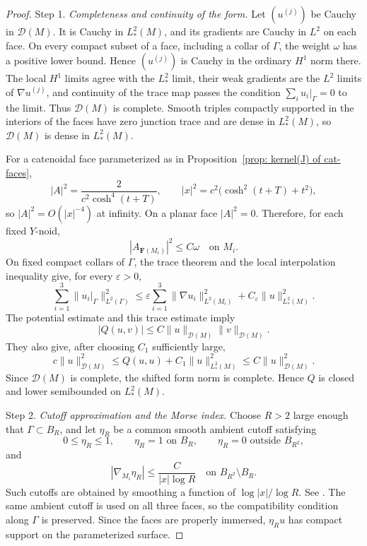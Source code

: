 \documentclass[11pt,twoside]{amsart}
\numberwithin{equation}{section}
\begin{document}
\begin{proof}
\noindent Step 1. \emph{Completeness and continuity of the form.}
Let $(u^{(j)})$ be Cauchy in $\mathcal D(M)$. It is Cauchy in $L_*^2(M)$, and its gradients are Cauchy in $L^2$ on each face. On every compact subset of a face, including a collar of $\Gamma$, the weight $\omega$ has a positive lower bound. Hence $(u^{(j)})$ is Cauchy in the ordinary $H^1$ norm there. The local $H^1$ limits agree with the $L_*^2$ limit, their weak gradients are the $L^2$ limits of $\nabla u^{(j)}$, and continuity of the trace map passes the condition $\sum_i u_i|_\Gamma=0$ to the limit. Thus $\mathcal D(M)$ is complete. Smooth triples compactly supported in the interiors of the faces have zero junction trace and are dense in $L_*^2(M)$, so $\mathcal D(M)$ is dense in $L_*^2(M)$.

For a catenoidal face parameterized as in Proposition~\ref{prop: kernel(J) of cat-faces},
\[
|A|^2=\frac{2}{c^2\cosh^4(t+T)},
\qquad
|x|^2=c^2\bigl(\cosh^2(t+T)+t^2\bigr),
\]
so $|A|^2=O(|x|^{-4})$ at infinity. On a planar face $|A|^2=0$. Therefore, for each fixed $Y$-noid,
\[
|A_{\mathbf F(M_i)}|^2\le C\omega\quad\text{on }M_i.
\]
On fixed compact collars of $\Gamma$, the trace theorem and the local interpolation inequality give, for every $\varepsilon>0$,
\[
\sum_{i=1}^3\|u_i|_\Gamma\|_{L^2(\Gamma)}^2
\le
\varepsilon\sum_{i=1}^3\|\nabla u_i\|_{L^2(M_i)}^2
+C_\varepsilon\|u\|_{L_*^2(M)}^2.
\]
The potential estimate and this trace estimate imply
\[
|Q(u,v)|\le C\|u\|_{\mathcal D(M)}\|v\|_{\mathcal D(M)}.
\]
They also give, after choosing $C_1$ sufficiently large,
\[
c\|u\|_{\mathcal D(M)}^2
\le Q(u,u)+C_1\|u\|_{L_*^2(M)}^2
\le C\|u\|_{\mathcal D(M)}^2.
\]
Since $\mathcal D(M)$ is complete, the shifted form norm is complete. Hence $Q$ is closed and lower semibounded on $L_*^2(M)$.

\medskip
\noindent Step 2. \emph{Cutoff approximation and the Morse index.}
Choose $R>2$ large enough that $\Gamma\subset B_R$, and let $\eta_R$ be a common smooth ambient cutoff satisfying
\[
0\le\eta_R\le1,
\qquad
\eta_R=1\text{ on }B_R,
\qquad
\eta_R=0\text{ outside }B_{R^2},
\]
and
\[
|\nabla_{M_i}\eta_R|
\le\frac{C}{|x|\log R}
\quad\text{on }B_{R^2}\setminus B_R.
\]
Such cutoffs are obtained by smoothing a function of $\log|x|/\log R$. See \cite[Section 2.6]{chodosh2018topology}. The same ambient cutoff is used on all three faces, so the compatibility condition along $\Gamma$ is preserved. Since the faces are properly immersed, $\eta_Ru$ has compact support on the parameterized surface.


\end{proof}
\end{document}

